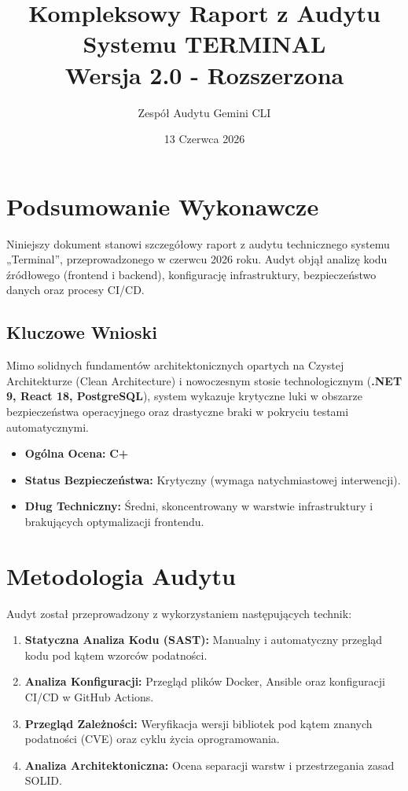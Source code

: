 \documentclass[a4paper,12pt]{article}
\title{
    \vspace{2cm}
    \textcolor{primary}{\Huge\textbf{Kompleksowy Raport z Audytu Systemu TERMINAL}}\\
    \vspace{1cm}
    \large Wersja 2.0 - Rozszerzona
}
\author{Zespół Audytu Gemini CLI}
\date{13 Czerwca 2026}
\begin{document}
\maketitle
\thispagestyle{empty}
\newpage

\tableofcontents
\newpage

\section{Podsumowanie Wykonawcze}
Niniejszy dokument stanowi szczegółowy raport z audytu technicznego systemu „Terminal”, przeprowadzonego w czerwcu 2026 roku. Audyt objął analizę kodu źródłowego (frontend i backend), konfigurację infrastruktury, bezpieczeństwo danych oraz procesy CI/CD.

\subsection{Kluczowe Wnioski}
Mimo solidnych fundamentów architektonicznych opartych na Czystej Architekturze (Clean Architecture) i nowoczesnym stosie technologicznym (\textbf{.NET 9, React 18, PostgreSQL}), system wykazuje krytyczne luki w obszarze bezpieczeństwa operacyjnego oraz drastyczne braki w pokryciu testami automatycznymi.

\begin{itemize}
    \item \textbf{Ogólna Ocena:} \textcolor{danger}{\textbf{C+}}
    \item \textbf{Status Bezpieczeństwa:} Krytyczny (wymaga natychmiastowej interwencji).
    \item \textbf{Dług Techniczny:} Średni, skoncentrowany w warstwie infrastruktury i brakujących optymalizacji frontendu.
\end{itemize}

\section{Metodologia Audytu}
Audyt został przeprowadzony z wykorzystaniem następujących technik:
\begin{enumerate}
    \item \textbf{Statyczna Analiza Kodu (SAST):} Manualny i automatyczny przegląd kodu pod kątem wzorców podatności.
    \item \textbf{Analiza Konfiguracji:} Przegląd plików Docker, Ansible oraz konfiguracji CI/CD w GitHub Actions.
    \item \textbf{Przegląd Zależności:} Weryfikacja wersji bibliotek pod kątem znanych podatności (CVE) oraz cyklu życia oprogramowania.
    \item \textbf{Analiza Architektoniczna:} Ocena separacji warstw i przestrzegania zasad SOLID.
\end{enumerate}
\end{document}
